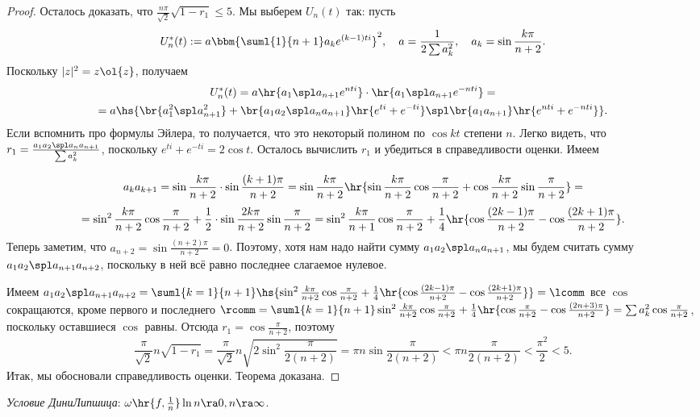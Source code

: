 \documentclass[a4paper]{article}
\begin{document}
\begin{proof}
Осталось доказать, что $\frac{n\pi}{\sqrt{2}}\sqrt{1 - r_1} \le 5$. Мы выберем $U_n(t)$ так: пусть
$$U_n^*(t) := a \bbm{\suml{1}{n+1} a_k e^{(k-1)ti}}^2, \quad a = \frac{1}{2\sum a_k^2},
\quad a_k = \sin \frac{k\pi}{n+2}.$$
Поскольку $|z|^2 = z \ol{z}$, получаем
\begin{multline*}
U_n^*(t) = a\hr{a_1\spl a_{n+1}e^{nti}}\cdot\hr{a_1\spl a_{n+1}e^{-nti}} =\\=
a\hs{\br{a_1^2\spl a_{n+1}^2} + \br{a_1a_2\spl a_na_{n+1}}
\hr{e^{ti} + e^{-ti}}\spl \br{a_1a_{n+1}}\hr{e^{nti}+ e^{-nti}}}.
\end{multline*}
Если вспомнить про формулы Эйлера, то получается, что это некоторый
полином по $\cos kt$ степени $n$. Легко видеть, что $r_1 = \frac{a_1a_2\spl a_n a_{n+1}}{\sum a_k^2}$, поскольку $e^{ti}+e^{-ti} = 2\cos t$.
Осталось вычислить $r_1$ и убедиться в справедливости оценки. Имеем

$$a_k a_{k+1} = \sin\frac{k\pi}{n+2}\cdot\sin\frac{(k+1)\pi}{n+2}=
\sin\frac{k\pi}{n+2}\hr{\sin\frac{k\pi}{n+2}\cos\frac{\pi}{n+2}+\cos\frac{k\pi}{n+2}\sin\frac{\pi}{n+2}}=$$
$$=\sin^2\frac{k\pi}{n+2}\cos\frac{\pi}{n+2} +\frac{1}{2}\cdot\sin\frac{2k\pi}{n+2}\sin\frac{\pi}{n+2}=
\sin^2\frac{k\pi}{n+1}\cos\frac{\pi}{n+2} +\frac{1}{4}\hr{\cos\frac{(2k-1)\pi}{n+2} - \cos\frac{(2k+1)\pi}{n+2}}.$$ Теперь заметим, что
$a_{n+2} = \sin\frac{(n+2)\pi}{n+2} = 0$. Поэтому, хотя нам надо найти сумму $a_1a_2\spl a_na_{n+1}$, мы будем считать сумму $a_1a_2\spl a_{n+1}a_{n+2}$,
поскольку в ней всё равно последнее слагаемое нулевое.

Имеем $a_1a_2\spl a_{n+1}a_{n+2}=\suml{k=1}{n+1}\hs{\sin^2\frac{k\pi}{n+2}\cos\frac{\pi}{n+2} +\frac{1}{4}\hr{\cos\frac{(2k-1)\pi}{n+2} - \cos\frac{(2k+1)\pi}{n+2}}} =\lcomm$
все $\cos$ сокращаются, кроме первого и последнего $\rcomm = \suml{k=1}{n+1}\sin^2\frac{k\pi}{n+2}\cos\frac{\pi}{n+2} +\frac{1}{4}\hr{\cos\frac{\pi}{n+2} - \cos\frac{(2n+3)\pi}{n+2}}=
\sum a_k^2 \cos\frac{\pi}{n+2}$, поскольку оставшиеся $\cos$ равны. Отсюда $r_1 = \cos \frac{\pi}{n+2}$, поэтому
$$\frac{\pi}{\sqrt{2}}n\sqrt{1-r_1} =\frac{\pi}{\sqrt{2}}n\sqrt{2\sin^2 \frac{\pi}{2(n+2)}} = \pi n \sin \frac{\pi}{2(n+2)}
< \pi n \frac{\pi}{2(n+2)} < \frac{\pi^2}{2} < 5.$$
Итак, мы обосновали справедливость оценки. Теорема доказана.
\end{proof}

\begin{df}
\emph{Условие Дини\ч Липшица}: $\omega\hr{f,\frac{1}{n}}\ln n \ra 0, n \ra \infty$.
\end{df}
\end{document}
